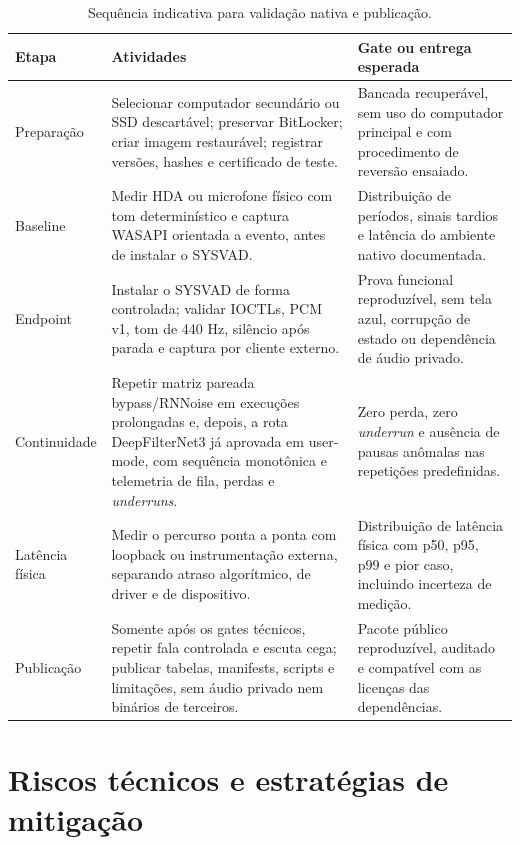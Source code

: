 \begin{table}[!htbp]
\centering
\caption{Sequência indicativa para validação nativa e publicação.}
\label{tab:plano-continuidade}
\small
{}
\begin{tabularx}{\textwidth}{>{\raggedright\arraybackslash}p{2.2cm}XX}
\toprule
\textbf{Etapa} & \textbf{Atividades} & \textbf{Gate ou entrega esperada} \\
\midrule
Preparação & Selecionar computador secundário ou SSD descartável; preservar BitLocker; criar imagem restaurável; registrar versões, hashes e certificado de teste. & Bancada recuperável, sem uso do computador principal e com procedimento de reversão ensaiado. \\
\addlinespace
Baseline & Medir HDA ou microfone físico com tom determinístico e captura WASAPI orientada a evento, antes de instalar o SYSVAD. & Distribuição de períodos, sinais tardios e latência do ambiente nativo documentada. \\
\addlinespace
Endpoint & Instalar o SYSVAD de forma controlada; validar IOCTLs, PCM v1, tom de 440 Hz, silêncio após parada e captura por cliente externo. & Prova funcional reproduzível, sem tela azul, corrupção de estado ou dependência de áudio privado. \\
\addlinespace
Continuidade & Repetir matriz pareada bypass/RNNoise em execuções prolongadas e, depois, a rota DeepFilterNet3 já aprovada em user-mode, com sequência monotônica e telemetria de fila, perdas e \textit{underruns}. & Zero perda, zero \textit{underrun} e ausência de pausas anômalas nas repetições predefinidas. \\
\addlinespace
Latência física & Medir o percurso ponta a ponta com loopback ou instrumentação externa, separando atraso algorítmico, de driver e de dispositivo. & Distribuição de latência física com p50, p95, p99 e pior caso, incluindo incerteza de medição. \\
\addlinespace
Publicação & Somente após os gates técnicos, repetir fala controlada e escuta cega; publicar tabelas, manifests, scripts e limitações, sem áudio privado nem binários de terceiros. & Pacote público reproduzível, auditado e compatível com as licenças das dependências. \\
\bottomrule
\end{tabularx}
\end{table}
\FloatBarrier

\section{Riscos técnicos e estratégias de mitigação}

